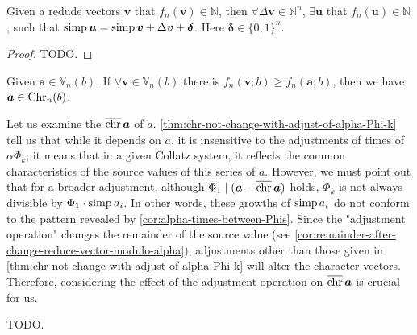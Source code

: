\begin{theorem}
    Given a redude vectors $\bm{v}$ that $f_{n}(\bm{v}) \in \mathbb{N}$, then $\forall \Delta\bm{v}\in \mathbb{N}^{n}$, $\exists \bm{u}$ that $f_{n}(\bm{u}) \in \mathbb{N}$, such that $\operatorname{simp}\bm{u} = \operatorname{simp}\bm{v} + \Delta\bm{v} + \bm{\delta}$. Here $\bm{\delta}\in\{0, 1\}^{n}$.
\end{theorem}
\begin{proof}
    TODO.
\end{proof}
\begin{corollary}
    Given $\bm{a}\in\mathbb{V}_{n}(b)$. If $\forall\bm{v}\in\mathbb{V}_{n}(b)$ there is $f_{n}(\bm{v};b) \ge f_{n}(\bm{a};b)$, then we have $\bm{a} \in \operatorname{Chr}_{n}({b})$.
\end{corollary}

Let us examine the $\operatorname{\overline{\operatorname{chr}}}\bm{a}$ of $a$. \cref{thm:chr-not-change-with-adjust-of-alpha-Phi-k} tell us that while it depends on $a$, it is insensitive to the adjustments of times of $\alpha\Phi_k$; it means that in a given Collatz system, it reflects the common characteristics of the source values of this series of $a$. However, we must point out that for a broader adjustment, although $\Phi_1 \mid (\bm{a} - \operatorname{\overline{\operatorname{chr}}}\bm{a})$ holds, $\Phi_k$ is not always divisible by $\Phi_1 \cdot \operatorname{simp} a_i$. In other words, these growths of $\operatorname{simp} a_i$ do not conform to the pattern revealed by \cref{cor:alpha-times-between-Phis}. Since the "adjustment operation" changes the remainder of the source value (see \cref{cor:remainder-after-change-reduce-vector-modulo-alpha}), adjustments other than those given in \cref{thm:chr-not-change-with-adjust-of-alpha-Phi-k} will alter the character vectors. Therefore, considering the effect of the adjustment operation on $\operatorname{\overline{\operatorname{chr}}}\bm{a}$ is crucial for us.

TODO.